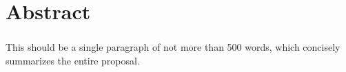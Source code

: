 \chapter*{Abstract} 
\subsection*{\thesistitle}

This should be a single paragraph of not more than 500 words, which concisely summarizes the entire proposal.
